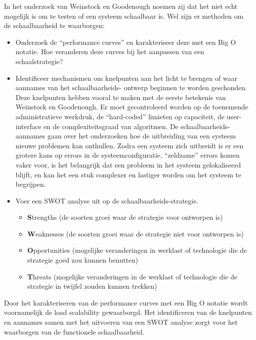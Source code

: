 In het onderzoek van Weinstock en Goodenough \parencite{OnSystemScalability} noemen zij dat het niet echt mogelijk is om te testen of een systeem schaalbaar is. Wel zijn er methoden om de schaalbaarheid te waarborgen:
\begin{itemize}
	\item Onderzoek de \enquote{performance curves} en karakteriseer deze met een Big O notatie. Hoe veranderen deze curves bij het aanpassen van een schaalstrategie? 
	
	\item Identificeer mechanismen om knelpunten aan het licht te brengen of waar aannames van het schaalbaarheids- ontwerp beginnen te worden geschonden. Deze knelpunten hebben vooral te maken met de eerste betekenis van Weinstock en Goodenough. Er moet gecontroleerd worden op de toenemende administratieve werkdruk, de \enquote{hard-coded} limieten op capaciteit, de user-interface en de complexiteitsgraad van algoritmen. De schaalbaarheids-aannames gaan over het onderzoeken hoe de uitbreiding van een systeem nieuwe problemen kan onthullen. Zodra een systeem zich uitbreidt is er een grotere kans op errors in de systeemconfiguratie, \enquote{zeldzame} errors komen vaker voor, is het belangrijk dat een probleem in het systeem gelokaliseerd blijft, en kan het een stuk complexer en lastiger worden om het systeem te begrijpen.
	
	\item Voer een SWOT analyse uit op de schaalbaarheids-strategie.
	\begin{itemize}
		\item \textbf{S}trengths (de soorten groei waar de strategie voor ontworpen is)
		\item \textbf{W}eaknesses (de soorten groei waar de strategie niet voor ontworpen is)
		\item \textbf{O}pportunities (mogelijke veranderingen in werklast of technologie die de strategie goed zou kunnen benutten)
		\item \textbf{T}hreats (mogelijke veranderingen in de werklast of technologie die de strategie in twijfel zouden kunnen trekken)
	\end{itemize}
\end{itemize}

Door het karakteriseren van de performance curves met een Big O notatie wordt voornamelijk de load scalability gewaarborgd. Het identificeren van de knelpunten en aannames samen met het uitvoeren van een SWOT analyse zorgt voor het waarborgen van de functionele schaalbaarheid.

